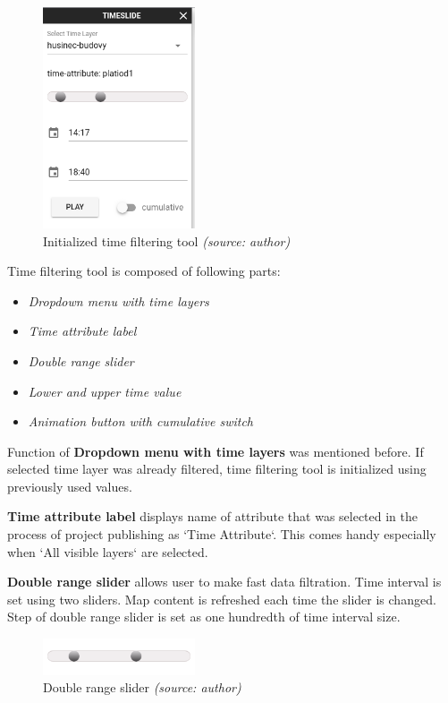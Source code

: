 \begin{figure}[h!]
	\centering
	\includegraphics[width=0.4\textwidth]{./img/time-filtering-tool.png}
	\caption{Initialized time filtering tool \textit{(source: author)}}
	\label{fig:time-filtering-tool}
\end{figure}

Time filtering tool is composed of following parts:

\begin{itemize}
	\item\textit{Dropdown menu with time layers}
	\item\textit{Time attribute label}
	\item\textit{Double range slider}
	\item\textit{Lower and upper time value}
	\item\textit{Animation button with cumulative switch}
\end{itemize}

Function of \textbf{Dropdown menu with time layers} was mentioned before.
If selected time layer was already filtered, time filtering 
tool is initialized using previously used values.

\textbf{Time attribute label} displays name of attribute that was selected
in the process of project publishing as `Time Attribute`. This 
comes handy especially when `All visible layers` are selected.

\textbf{Double range slider} allows user to make fast data filtration.
Time interval is set using two sliders. Map content is refreshed 
each time the slider is changed. Step of double range slider is set 
as one hundredth of time interval size.

\begin{figure}[h!]
	\centering
	\includegraphics[width=0.4\textwidth]{./img/time-slider.png}
	\caption{Double range slider \textit{(source: author)}}
	\label{fig:time-slider}
\end{figure}

